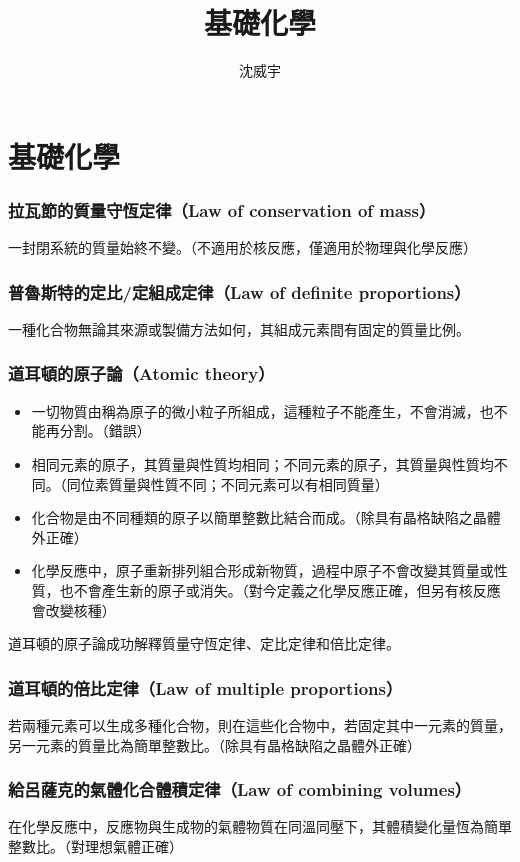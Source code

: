 \documentclass[a4paper,12pt]{article}
\begin{document}
\title{基礎化學}
\author{沈威宇}
\date{\temtoday}
\titletocdoc
\section{基礎化學}
\subsubsection{拉瓦節的質量守恆定律（Law of conservation of mass）}
一封閉系統的質量始終不變。（不適用於核反應，僅適用於物理與化學反應）
\subsubsection{普魯斯特的定比/定組成定律（Law of definite proportions）}
一種化合物無論其來源或製備方法如何，其組成元素間有固定的質量比例。
\subsubsection{道耳頓的原子論（Atomic theory）}
\begin{itemize}
\item 一切物質由稱為原子的微小粒子所組成，這種粒子不能產生，不會消滅，也不能再分割。（錯誤）
\item 相同元素的原子，其質量與性質均相同；不同元素的原子，其質量與性質均不同。（同位素質量與性質不同；不同元素可以有相同質量）
\item 化合物是由不同種類的原子以簡單整數比結合而成。（除具有晶格缺陷之晶體外正確）
\item 化學反應中，原子重新排列組合形成新物質，過程中原子不會改變其質量或性質，也不會產生新的原子或消失。（對今定義之化學反應正確，但另有核反應會改變核種）
\end{itemize}
道耳頓的原子論成功解釋質量守恆定律、定比定律和倍比定律。
\subsubsection{道耳頓的倍比定律（Law of multiple proportions）}
若兩種元素可以生成多種化合物，則在這些化合物中，若固定其中一元素的質量，另一元素的質量比為簡單整數比。（除具有晶格缺陷之晶體外正確）
\subsubsection{給呂薩克的氣體化合體積定律（Law of combining volumes）}
在化學反應中，反應物與生成物的氣體物質在同溫同壓下，其體積變化量恆為簡單整數比。（對理想氣體正確）
\end{document}
